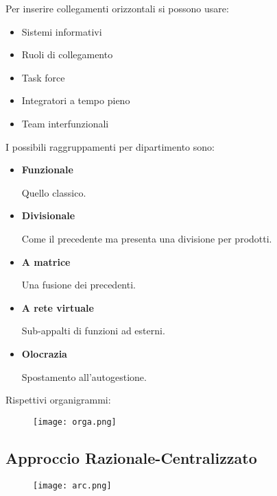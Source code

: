 \documentclass{article}
\begin{document}
\noindent Per inserire collegamenti orizzontali si possono usare:
\begin{itemize}
    \item Sistemi informativi
    \item Ruoli di collegamento
    \item Task force
    \item Integratori a tempo pieno
    \item Team interfunzionali\newline
\end{itemize}

\noindent I possibili raggruppamenti per dipartimento sono:
\begin{itemize}
    \item \textbf{Funzionale}
    
        Quello classico.
    \item \textbf{Divisionale}

        Come il precedente ma presenta una divisione per prodotti.
    
    \item \textbf{A matrice}

        Una fusione dei precedenti.
    
    \item \textbf{A rete virtuale}

        Sub-appalti di funzioni ad esterni.
    
    \item \textbf{Olocrazia}

        Spostamento all'autogestione.
    
\end{itemize}

\newpage

\noindent Rispettivi organigrammi:

\begin{figure}[ht]
    \centering
    \texttt{[image: orga.png]}
\end{figure}

\newpage

\subsection{Approccio Razionale-Centralizzato}

\begin{figure}[ht]
    \centering
    \texttt{[image: arc.png]}
\end{figure}
\end{document}
